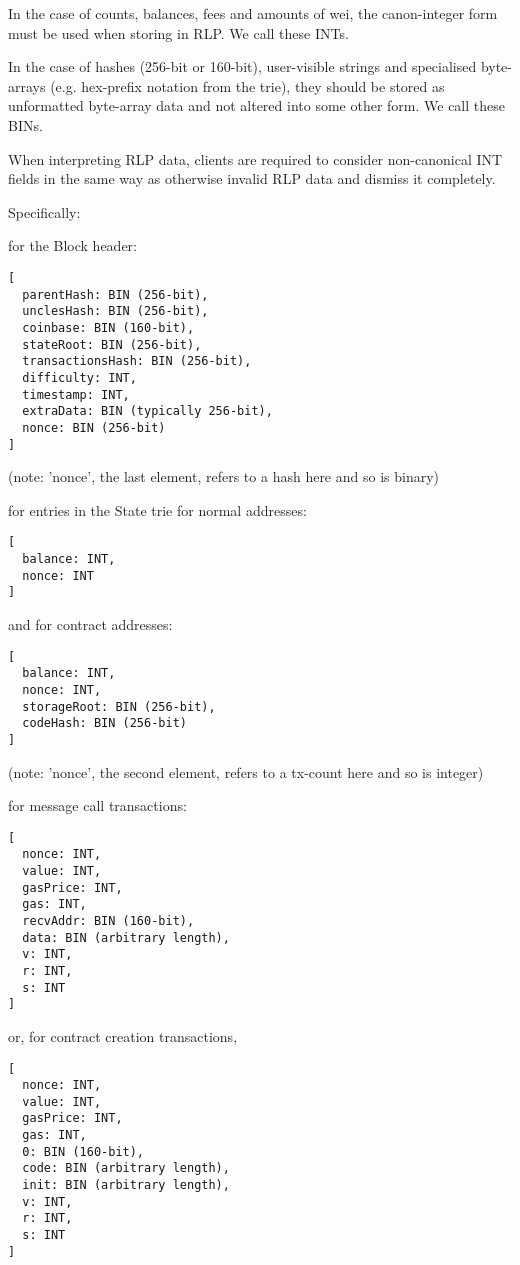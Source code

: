 \documentclass[9pt,oneside]{amsart}
\begin{document}
\begin{multicols}{2}
In the case of counts, balances, fees and amounts of wei, the canon-integer form must be used when storing in RLP. We call these INTs.

In the case of hashes (256-bit or 160-bit), user-visible strings and specialised byte-arrays (e.g. hex-prefix notation from the trie), they should be stored as unformatted byte-array data and not altered into some other form. We call these BINs.

When interpreting RLP data, clients are required to consider non-canonical INT fields in the same way as otherwise invalid RLP data and dismiss it completely.

Specifically:

for the Block header:
\begin{verbatim}
[
  parentHash: BIN (256-bit),
  unclesHash: BIN (256-bit),
  coinbase: BIN (160-bit),
  stateRoot: BIN (256-bit),
  transactionsHash: BIN (256-bit),
  difficulty: INT,
  timestamp: INT,
  extraData: BIN (typically 256-bit),
  nonce: BIN (256-bit)
]
\end{verbatim}

(note: 'nonce', the last element, refers to a hash here and so is binary)

for entries in the State trie for normal addresses:
\begin{verbatim}
[
  balance: INT,
  nonce: INT
]
\end{verbatim}

and for contract addresses:
\begin{verbatim}
[
  balance: INT,
  nonce: INT,
  storageRoot: BIN (256-bit),
  codeHash: BIN (256-bit)
]
\end{verbatim}

(note: 'nonce', the second element, refers to a tx-count here and so is integer)

for message call transactions:

\begin{verbatim}
[
  nonce: INT,
  value: INT,
  gasPrice: INT,
  gas: INT,
  recvAddr: BIN (160-bit),
  data: BIN (arbitrary length),
  v: INT,
  r: INT,
  s: INT
]
\end{verbatim}

or, for contract creation transactions,

\begin{verbatim}
[
  nonce: INT,
  value: INT,
  gasPrice: INT,
  gas: INT,
  0: BIN (160-bit),
  code: BIN (arbitrary length),
  init: BIN (arbitrary length),
  v: INT,
  r: INT,
  s: INT
]
\end{verbatim}


\end{multicols}
\end{document}
